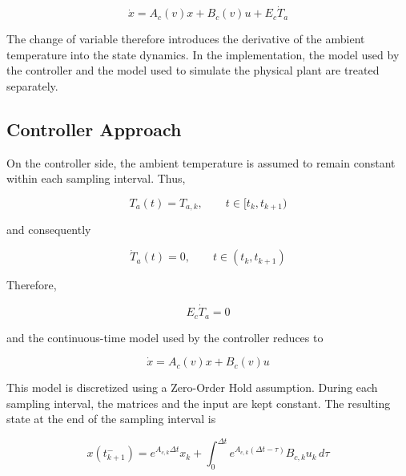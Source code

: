 \begin{equation}
    \dot{x}
    =
    A_c(v)x
    +
    B_c(v)u
    +
    E_c\dot{T}_a
    \label{eq:district_full_continuous}
\end{equation}

The change of variable therefore introduces the derivative of the ambient
temperature into the state dynamics. In the implementation, the model used
by the controller and the model used to simulate the physical plant are
treated separately.


\subsection{Controller Approach}
\label{subsec:district_controller}

On the controller side, the ambient temperature is assumed to remain constant
within each sampling interval. Thus,

\begin{equation}
    T_a(t)
    =
    T_{a,k},
    \qquad
    t\in[t_k,t_{k+1})
\end{equation}

and consequently

\begin{equation}
    \dot{T}_a(t)
    =
    0,
    \qquad
    t\in(t_k,t_{k+1})
\end{equation}

Therefore,

\begin{equation}
    E_c\dot{T}_a=0
\end{equation}

and the continuous-time model used by the controller reduces to

\begin{equation}
    \boxed{
    \dot{x}
    =
    A_c(v)x
    +
    B_c(v)u
    }
    \label{eq:district_controller_continuous}
\end{equation}

This model is discretized using a Zero-Order Hold assumption. During each
sampling interval, the matrices and the input are kept constant. The
resulting state at the end of the sampling interval is

\begin{equation}
    x(t_{k+1}^{-})
    =
    e^{A_{c,k}\Delta t}x_k
    +
    \int_{0}^{\Delta t}
    e^{A_{c,k}(\Delta t-\tau)}
    B_{c,k}u_k
    \,d\tau
    \label{eq:district_zoh}
\end{equation}

